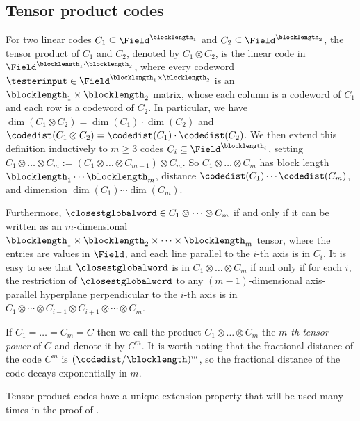 \documentclass{toc}
\theoremstyle{plain}
\begin{document}
\subsection{Tensor product codes}
\label{sec:tensor-product-codes}

%
%
%

For two linear codes
$C_1 \subseteq \Field^{\blocklength_1}$ and
$C_2 \subseteq \Field^{\blocklength_2}$,
the tensor product of $C_1$ and $C_2$, denoted by $C_1 \otimes C_2$,
is the linear code in
$\Field^{\blocklength_1\cdot\blocklength_2}$,
where every codeword
$\testerinput \in \Field^{\blocklength_1 \times \blocklength_2}$
is an $\blocklength_1 \times \blocklength_2$ matrix, whose each column
is a codeword of $C_1$ and each row is a codeword of $C_2$.
In particular, we have $\dim(C_1\otimes C_2)=\dim(C_1)\cdot\dim(C_2)$
and $\codedist(C_1\otimes C_2) = \codedist(C_1) \cdot \codedist(C_2)$.
%
%
%
%
We then extend this definition inductively to $m\ge 3$ codes
$C_i \subseteq \Field^{\blocklength_i}$, setting
$C_1\otimes\dots\otimes C_m:=
(C_1\otimes\dots\otimes C_{m-1})\otimes C_m$.  
So $C_1\otimes\dots\otimes C_m$ has
block length $\blocklength_1\cdots \blocklength_m$,
distance $\codedist(C_1)\cdots \codedist(C_m)$, and
dimension $\dim(C_1)\cdots\dim(C_m)$.

Furthermore, $\closestglobalword \in C_1\otimes\dots\otimes C_m$
if and only if it can be written as an $m$-dimensional 
$\blocklength_1 \times \blocklength_2 \times \dots \times \blocklength_m$
tensor, where the entries are values in $\Field$, and each line parallel
to the $i$-th axis is in $C_i$. It is easy to see that
$\closestglobalword$ is in $C_1\otimes\dots\otimes C_m$
if and only if for each $i$, the restriction of $\closestglobalword$ to
any $(m-1)$-dimensional axis-parallel hyperplane perpendicular to
the $i$-th axis is in
$C_1\otimes\cdots\otimes C_{i-1}\otimes C_{i+1}\otimes\cdots\otimes C_m$.

If $C_1=\dots=C_m=C$ then we call the
product $C_1\otimes\dots\otimes C_m$ the
\emph{$m$-th tensor power} of $C$ and denote it by $C^m$.
It is worth noting that the fractional distance of the code
$C^m$ is $(\codedist/\blocklength)^m$, so the fractional distance
of the code decays exponentially in $m$.
%

%
%
%
%
%
%
%
%
%
%
%
%
%
%
%
%
%
%
%
%
%
%
%
%
%
%
%
%
%
%

Tensor product codes have a unique extension property that will be used many times in the proof of .
\end{document}
